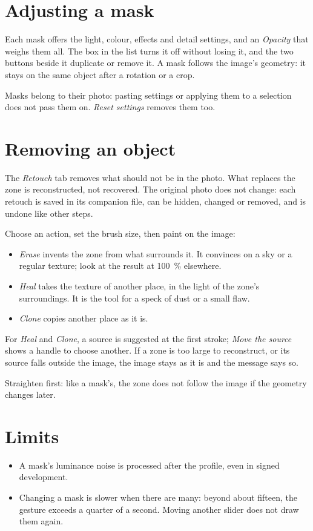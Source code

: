 \section{Adjusting a mask}
Each mask offers the light, colour, effects and detail settings, and an \emph{Opacity} that weighs
them all. The box in the list turns it off without losing it, and the two buttons beside it
duplicate or remove it. A mask follows the image's geometry: it stays on the same object after a
rotation or a crop.

Masks belong to their photo: pasting settings or applying them to a selection does not pass them
on. \emph{Reset settings} removes them too.

\section{Removing an object}
The \emph{Retouch} tab removes what should not be in the photo. What replaces the zone is
reconstructed, not recovered. The original photo does not change: each retouch is saved in its
companion file, can be hidden, changed or removed, and is undone like other steps.

Choose an action, set the brush size, then paint on the image:
\begin{itemize}
\item \emph{Erase} invents the zone from what surrounds it. It convinces on a sky or a regular
texture; look at the result at 100~\% elsewhere.
\item \emph{Heal} takes the texture of another place, in the light of the zone's surroundings. It
is the tool for a speck of dust or a small flaw.
\item \emph{Clone} copies another place as it is.
\end{itemize}
For \emph{Heal} and \emph{Clone}, a source is suggested at the first stroke; \emph{Move the source}
shows a handle to choose another. If a zone is too large to reconstruct, or its source falls outside
the image, the image stays as it is and the message says so.

Straighten first: like a mask's, the zone does not follow the image if the geometry changes later.

\section{Limits}
\begin{itemize}
\item A mask's luminance noise is processed after the profile, even in signed development.
\item Changing a mask is slower when there are many: beyond about fifteen, the gesture exceeds a
quarter of a second. Moving another slider does not draw them again.
\end{itemize}
